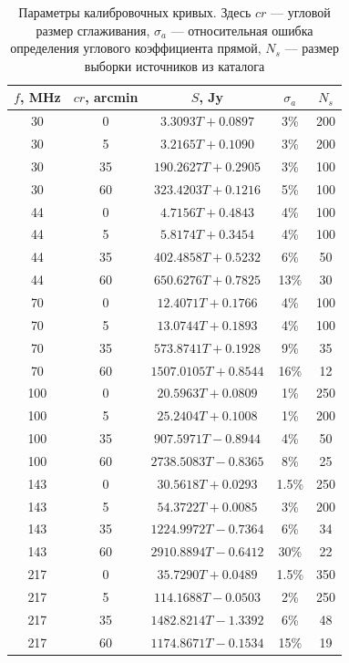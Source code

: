\documentclass[12pt,a4paper]{article}
\begin{document}
\begin{table}[h!]
	\setcaptionmargin{0mm}
	\caption{Параметры калибровочных кривых. Здесь $cr$ --- угловой размер сглаживания, $\sigma_a$ --- относительная ошибка определения углового коэффициента прямой, $N_s$ --- размер выборки источников из каталога}
	\label{tab:calib}
	\medskip
	\begin{tabular}{c|c|c|c|c}
		$f$, MHz & $cr$, arcmin & $S$, Jy & $\sigma_a$ & $N_s$\\[3 pt] \hline
		30 & 0 & $3.3093T+0.0897$ & 3\% & 200\\[3 pt]
		30 & 5 & $3.2165T+0.1090$ & 3\% & 200\\[3 pt]
		30 & 35 & $190.2627T+0.2905$ & 3\% & 100\\[3 pt]
		30 & 60 & $323.4203T+0.1216$ & 5\% & 100\\[3 pt]
		44 & 0 & $4.7156T+0.4843$ & 4\% & 100\\[3 pt]
		44 & 5 & $5.8174T+0.3454$ & 4\% & 100\\[3 pt]
		44 & 35 & $402.4858T+0.5232$ & 6\% & 50\\[3 pt]
		44 & 60 & $650.6276T+0.7825$ & 13\% & 30\\[3 pt]
		70 & 0 & $12.4071T+0.1766$ & 4\% & 100\\[3 pt]
		70 & 5 & $13.0744T+0.1893$ & 4\% & 100\\[3 pt]
		70 & 35 & $573.8741T+0.1928$& 9\% & 35\\[3 pt]
		70 & 60 & $1507.0105T+0.8544$ & 16\% & 12\\[3 pt]
		100 & 0 & $20.5963T+0.0809$ & 1\% & 250\\[3 pt]
		100 & 5 & $25.2404T+0.1008$ & 1\% & 200\\[3 pt]
		100 & 35 & $907.5971T-0.8944$ & 4\% & 50\\[3 pt]
		100 & 60 & $2738.5083T-0.8365$ & 8\% & 25\\[3 pt]
		143 & 0 & $30.5618T+0.0293$ & 1.5\% & 250\\[3 pt]
		143 & 5 & $54.3722T+0.0085$ & 3\% & 200\\[3 pt]
		143 & 35 & $1224.9972T-0.7364$ & 6\% & 34\\[3 pt]
		143 & 60 & $2910.8894T-0.6412$ & 30\% & 22\\[3 pt]
		217 & 0 & $35.7290T+0.0489$ & 1.5\% & 350\\[3 pt]
		217 & 5 & $114.1688T-0.0503$ & 2\% & 250\\[3 pt]
		217 & 35 & $1482.8214T-1.3392$ & 6\% & 48\\[3 pt]
		217 & 60 & $1174.8671T-0.1534$ & 15\% & 19\\[3 pt]
	\end{tabular}
\end{table}
\end{document}
